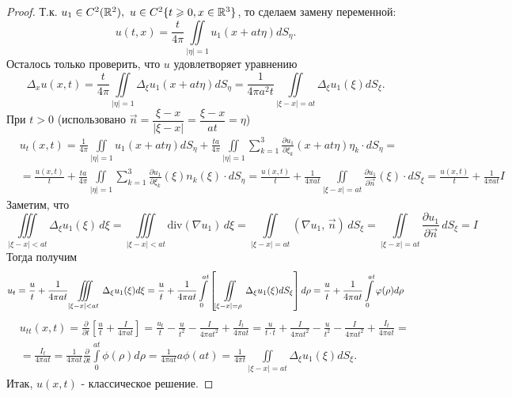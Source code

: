 \documentclass[../main.tex]{subfiles}
\begin{document}
\begin{proof}
Т.к. $u_1\in C^2(\R^2),\ u\in C^2\{t\geq 0, x\in\R^3\}$, то сделаем замену переменной:
\[
u(t, x)=\frac{t}{4\pi}\iint\limits_{|\eta |=1}u_1(x+at\eta )dS_{\eta}.
\]
Осталось только проверить, что $u$ удовлетворяет уравнению
\[
\Delta_xu(x, t)=\frac{t}{4\pi}\iint\limits_{|\eta |=1}\Delta_{\xi}u_1(x+at\eta )dS_{\eta}=\frac{1}{4\pi a^2t}\iint\limits_{|\xi - x|=at}\Delta_{\xi}u_1(\xi )dS_{\xi}.
\]
При $t>0$ (использовано $\vec{n}=\dfrac{\xi - x}{|\xi - x|}=\dfrac{\xi - x}{at}=\eta$)
\begin{equation*}
\begin{split}
&u_t(x,t)=\frac{1}{4\pi}\iint\limits_{|\eta |=1}u_1(x+at\eta )dS_{\eta}+\frac{ta}{4\pi}\iint\limits_{|\eta |=1}\sum\limits_{k=1}^3 \frac{\partial u_1}{\partial \xi_k}(x+at\eta )\eta_k\cdot dS_{\eta}=\\
&=\frac{u(x, t)}{t}+\frac{ta}{4\pi}\iint\limits_{|\eta |=1}\sum\limits_{k=1}^3 \frac{\partial u_1}{\partial \xi_k}(\xi )n_k(\xi )\cdot dS_{\eta}=\frac{u(x, t)}{t}+\frac{1}{4\pi at}\iint\limits_{|\xi - x |=at}\frac{\partial u_1}{\partial \vec{n}}(\xi )\cdot dS_{\xi}=\frac{u(x, t)}{t} + \frac{1}{4\pi at}I
\end{split}
\end{equation*}
Заметим, что
\[
\iiint\limits_{|\xi - x|<at}\Delta_{\xi}u_1(\xi)\, d\xi =\iiint\limits_{|\xi - x|<at}\mathrm{div} (\nabla u_1)\, d\xi =\iint\limits_{|\xi - x|=at} (\nabla u_1,\, \vec{n})\, dS_{\xi }=\iint\limits_{|\xi - x|=at}\frac{\partial u_1}{\partial\vec{n}}\, dS_{\xi }=I
\]
Тогда получим 
$$
u_t=\frac{u}{t}+\frac{1}{4\pi at}\iiint\limits_{|\xi - x|<at}\Delta_{\xi}u_1(\xi )d\xi \\
= \frac{u}{t}+\frac{1}{4\pi at}\int\limits_0^{at} \left[\iint\limits_{|\xi - x|=\rho}\Delta_{\xi}u_1(\xi )dS_{\xi}\right]d\rho \\
= \frac{u}{t}+\frac{1}{4\pi at}\int\limits_0^{at}\phi (\rho )d\rho
$$
\begin{equation*}
\begin{split}
&u_{tt}(x, t)=\frac{\partial}{\partial t}\left[\frac{u}{t}+\frac{I}{4\pi at} \right]=\frac{u_t}{t}-\frac{u}{t^2}-\frac{I}{4\pi at^2}+\frac{I_t}{4\pi at}=\frac{u}{t\cdot t}+\frac{I}{4\pi at^2}-\frac{u}{t^2}-\frac{I}{4\pi at^2}+\frac{I_t}{4\pi at}=\\
&=\frac{I_t}{4\pi at}=\frac{1}{4\pi at}\frac{\partial}{\partial t}\int\limits_0^{at}\phi (\rho )d\rho = \frac{1}{4\pi at}a\phi(at)=\frac{1}{4\pi t}\iint\limits_{|\xi - x|=at}\Delta_{\xi}u_1(\xi )dS_{\xi}.
\end{split}
\end{equation*}
Итак, $u(x, t)$ - классическое решение.
\end{proof}
\end{document}

